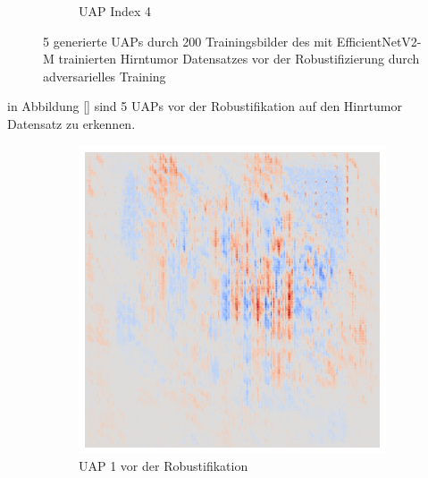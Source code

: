 \begin{figure}[ht!]
\begin{subfigure}{0.19\linewidth}
        \caption{UAP Index 4}
    \end{subfigure}
    \caption{5 generierte UAPs durch 200 Trainingsbilder des mit EfficientNetV2-M trainierten Hirntumor Datensatzes vor der Robustifizierung durch adversarielles Training}
    \label{fig:uap-resnet18-mri-rob0}
\end{figure}

in Abbildung \ref{} sind 5 UAPs vor der Robustifikation auf den Hinrtumor Datensatz zu erkennen. 

\newpage

\begin{figure}[ht!]
    \centering
    \begin{subfigure}{0.19\linewidth}
        \centering
        \includegraphics[height=1\linewidth]{01-images/05-resultate/uap_efficientnet/uap0-efficientnetv2m-mri-n200-robustificationslevel0.png}
        \caption{UAP 1 vor der Robustifikation}
    \end{subfigure}
    \begin{subfigure}{0.19\linewidth}
        \centering

\end{subfigure}
\end{figure}
